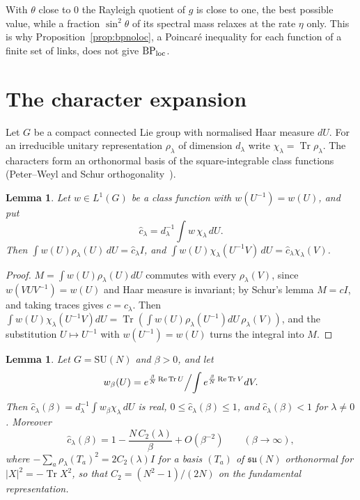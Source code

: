 \documentclass[aps,prd,twocolumn,superscriptaddress,nofootinbib,longbibliography,floatfix,amsmath,amssymb,10pt]{revtex4-2}
\newtheorem{lemma}[theorem]{Lemma}
\theoremstyle{definition}
\theoremstyle{remark}
\newcommand{\SU}{\mathrm{SU}}
\newcommand{\Tr}{\operatorname{Tr}}
\newcommand{\ReTr}{\operatorname{Re}\operatorname{Tr}}
\begin{document}
With $\theta$ close to $0$ the Rayleigh quotient of $g$ is close to one,
the best possible value, while a fraction $\sin^2\theta$ of its spectral
mass relaxes at the rate $\eta$ only. This is why
Proposition~\ref{prop:bpnoloc}, a Poincar\'e inequality for each function
of a finite set of links, does not give $\mathrm{BP}_{\rm loc}$.

\section{The character expansion}\label{app:characters}

Let $G$ be a compact connected Lie group with normalised Haar measure $dU$.
For an irreducible unitary representation $\rho_\lambda$ of dimension
$d_\lambda$ write $\chi_\lambda=\Tr\rho_\lambda$. The characters form an
orthonormal basis of the square-integrable class functions
(Peter--Weyl and Schur orthogonality~\cite[Chs.~2--4]{Bum13}).

\begin{lemma}\label{lem:convolution}
Let $w\in L^1(G)$ be a class function with $w(U^{-1})=w(U)$, and put
\[
\hat c_\lambda=d_\lambda^{-1}\int w\,\chi_\lambda\,dU .
\]
Then $\int
w(U)\rho_\lambda(U)\,dU=\hat c_\lambda I$, and
$\int w(U)\chi_\lambda(U^{-1}V)\,dU=\hat c_\lambda\chi_\lambda(V)$.
\end{lemma}

\begin{proof}
$M=\int w(U)\rho_\lambda(U)dU$ commutes with every $\rho_\lambda(V)$, since
$w(VUV^{-1})=w(U)$ and Haar measure is invariant; by Schur's lemma
$M=cI$, and taking traces gives $c=\hat c_\lambda$. Then $\int
w(U)\chi_\lambda(U^{-1}V)dU=\Tr(\int w(U)\rho_\lambda(U^{-1})dU\,
\rho_\lambda(V))$, and the substitution $U\mapsto U^{-1}$ with
$w(U^{-1})=w(U)$ turns the integral into $M$.
\end{proof}

\begin{lemma}\label{lem:wilsoncoeff}
Let $G=\SU(N)$ and $\beta>0$, and let
\[
w_\beta(U)=e^{\frac\beta N\ReTr U}\Bigl/\int e^{\frac\beta N\ReTr V}dV .
\]
Then $\hat c_\lambda(\beta)=d_\lambda^{-1}\int
w_\beta\chi_\lambda\,dU$ is real, $0\le\hat c_\lambda(\beta)\le1$, and
$\hat c_\lambda(\beta)<1$ for $\lambda\ne0$. Moreover
\[
\hat c_\lambda(\beta)=1-\frac{N\,C_2(\lambda)}\beta+O(\beta^{-2})\qquad
(\beta\to\infty),
\]
where $-\sum_a\rho_\lambda(T_a)^2=2C_2(\lambda)I$ for a basis $(T_a)$ of
$\mathfrak{su}(N)$ orthonormal for $|X|^2=-\Tr X^2$, so that
$C_2=(N^2-1)/(2N)$ on the fundamental representation.
\end{lemma}
\end{document}
